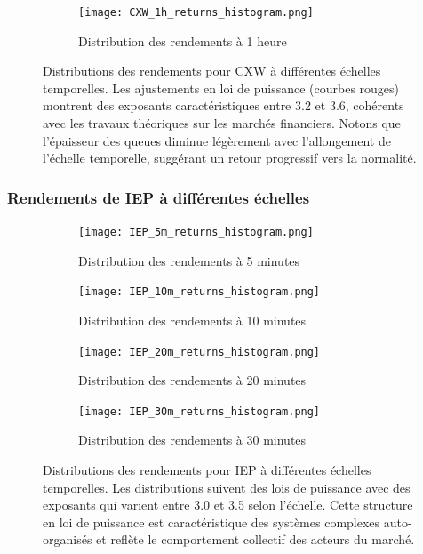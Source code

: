 \documentclass[10pt,a4paper]{article}
\theoremstyle{definition}
\theoremstyle{remark}
\begin{document}
\begin{itemize}
\begin{figure}[H]
    \vspace{0.5cm}
    
    \begin{subfigure}[b]{0.45\textwidth}
        \texttt{[image: CXW\_1h\_returns\_histogram.png]}
        \caption{Distribution des rendements à 1 heure}
        \label{fig:CXW_1h_moved}
    \end{subfigure}
    \caption{Distributions des rendements pour CXW à différentes échelles temporelles. Les ajustements en loi de puissance (courbes rouges) montrent des exposants caractéristiques entre 3.2 et 3.6, cohérents avec les travaux théoriques sur les marchés financiers. Notons que l'épaisseur des queues diminue légèrement avec l'allongement de l'échelle temporelle, suggérant un retour progressif vers la normalité.}
    \label{fig:CXW_multi_scale_moved}
\end{figure}

\subsubsection{Rendements de IEP à différentes échelles}

\begin{figure}[H]
    \centering
    \begin{subfigure}[b]{0.45\textwidth}
        \texttt{[image: IEP\_5m\_returns\_histogram.png]}
        \caption{Distribution des rendements à 5 minutes}
        \label{fig:IEP_5m_moved}
    \end{subfigure}
    \hfill
    \begin{subfigure}[b]{0.45\textwidth}
        \texttt{[image: IEP\_10m\_returns\_histogram.png]}
        \caption{Distribution des rendements à 10 minutes}
        \label{fig:IEP_10m_moved}
    \end{subfigure}
    
    \vspace{0.5cm}
    
    \begin{subfigure}[b]{0.45\textwidth}
        \texttt{[image: IEP\_20m\_returns\_histogram.png]}
        \caption{Distribution des rendements à 20 minutes}
        \label{fig:IEP_20m_moved}
    \end{subfigure}
    \hfill
    \begin{subfigure}[b]{0.45\textwidth}
        \texttt{[image: IEP\_30m\_returns\_histogram.png]}
        \caption{Distribution des rendements à 30 minutes}
        \label{fig:IEP_30m_moved}
    \end{subfigure}
    \caption{Distributions des rendements pour IEP à différentes échelles temporelles. Les distributions suivent des lois de puissance avec des exposants qui varient entre 3.0 et 3.5 selon l'échelle. Cette structure en loi de puissance est caractéristique des systèmes complexes auto-organisés et reflète le comportement collectif des acteurs du marché.}
    \label{fig:IEP_multi_scale_moved}
\end{figure}


\end{itemize}
\end{document}
